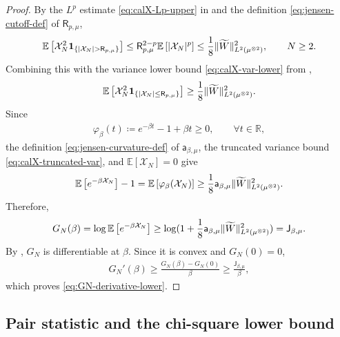 \documentclass[11pt,reqno]{amsart}
\numberwithin{equation}{section}
\theoremstyle{plain}
\theoremstyle{remark}
\DeclarePairedDelimiter{\pa}{\lparen}{\rparen}
\DeclarePairedDelimiter{\norm}{\lVert}{\rVert}
\newcommand{\R}{{\mathbb{R}}}
\newcommand{\E}{{\mathbb{E}}}
\newcommand{\tl}{\widetilde}
\newcommand{\be}{\beta}
\newcommand{\one}{\mathbf 1}
\begin{document}
\begin{proof}
By the \(L^p\) estimate \eqref{eq:calX-Lp-upper} in
 and the definition
\eqref{eq:jensen-cutoff-def} of \(\mathsf R_{p,\mu}\),
\begin{align}\label{eq:calX-tail-second-moment}
 \E\left[\mathcal X_N^2\one_{\{|\mathcal X_N|>\mathsf R_{p,\mu}\}}\right]
 \le \mathsf R_{p,\mu}^{2-p}\E\left[|\mathcal X_N|^p\right]
 \le \frac18\norm{\tl W}_{L^2(\mu^{\otimes2})}^2,
 \qquad N\ge2.
\end{align}
Combining this with the variance lower bound \eqref{eq:calX-var-lower} from
,
\begin{align}
 \E\left[\mathcal X_N^2
 \one_{\{|\mathcal X_N|\le\mathsf R_{p,\mu}\}}\right]
 \ge \frac18\norm{\tl W}_{L^2(\mu^{\otimes2})}^2.
 \label{eq:calX-truncated-var}
\end{align}
Since
\begin{align}\label{eq:jensen-phi-def}
 \varphi_\be(t)\coloneqq e^{-\be t}-1+\be t \ge 0,
 \qquad \forall t\in\R,
\end{align}
the definition \eqref{eq:jensen-curvature-def} of \(\mathsf a_{\be,\mu}\),
the truncated variance bound \eqref{eq:calX-truncated-var}, and
\(\E\left[\mathcal X_N\right]=0\) give
\begin{align}\label{eq:jensen-exponential-lower}
 \E\left[e^{-\be \mathcal X_N}\right]-1
 =\E\left[\varphi_\be(\mathcal X_N)\right]
 \ge \frac18\mathsf a_{\be,\mu}\norm{\tl W}_{L^2(\mu^{\otimes2})}^2.
\end{align}
Therefore,
\begin{align}\label{eq:GN-gap-proof}
 G_N(\be)=\log\E\left[e^{-\be \mathcal X_N}\right]
 \ge \log\pa{1+\frac18\mathsf a_{\be,\mu}
 \norm{\tl W}_{L^2(\mu^{\otimes2})}^2}=\mathsf J_{\be,\mu}.
\end{align}
By , \(G_N\) is differentiable at \(\be\).  Since it
is convex and \(G_N(0)=0\),
\begin{align}\label{eq:GN-convex-derivative-bound}
 G_N'(\be)\ge \frac{G_N(\be)-G_N(0)}{\be}
 \ge \frac{\mathsf J_{\be,\mu}}{\be},
\end{align}
which proves \eqref{eq:GN-derivative-lower}.
\end{proof}


\subsection{Pair statistic and the chi-square lower bound}
\label{sec:pair-statistic-lower-bound}
\end{document}
